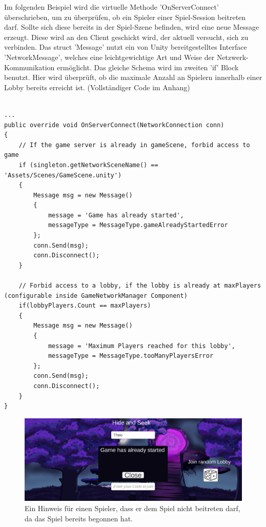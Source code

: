 Im folgenden Beispiel wird die virtuelle Methode 'OnServerConnect' überschrieben, um zu überprüfen, ob ein Spieler einer Spiel-Session beitreten darf. Sollte sich diese bereits in der Spiel-Szene befinden, wird eine neue Message erzeugt. Diese wird an den Client geschickt wird, der aktuell versucht, sich zu verbinden. Das struct 'Message' nutzt ein von Unity bereitgestelltes Interface 'NetworkMessage', welches eine leichtgewichtige Art und Weise der Netzwerk-Kommunikation ermöglicht. Das gleiche Schema wird im zweiten 'if' Block benutzt. Hier wird überprüft, ob die maximale Anzahl an Spielern innerhalb einer Lobby bereits erreicht ist. (Vollständiger Code im Anhang)

\begin{lstlisting}[caption= GameNetworkManager.cs OnServerConnect() und Message struct]

...	
public override void OnServerConnect(NetworkConnection conn)
{
	// If the game server is already in gameScene, forbid access to game
	if (singleton.getNetworkSceneName() == 'Assets/Scenes/GameScene.unity')
	{
		Message msg = new Message()
		{
			message = 'Game has already started',
			messageType = MessageType.gameAlreadyStartedError
		};
		conn.Send(msg);
		conn.Disconnect();
	}
	
	// Forbid access to a lobby, if the lobby is already at maxPlayers (configurable inside GameNetworkManager Component)
	if(lobbyPlayers.Count == maxPlayers)
	{
		Message msg = new Message()
		{
			message = 'Maximum Players reached for this lobby',
			messageType = MessageType.tooManyPlayersError
		};
		conn.Send(msg);
		conn.Disconnect();
	}
}
\end{lstlisting}

\begin{figure}[H]
	\centering
	\includegraphics[width=120mm]{images/prototyp_game_has_already_started.png}
	\caption[Game has already started]{Ein Hinweis für einen Spieler, dass er dem Spiel nicht beitreten darf, da das Spiel bereits begonnen hat.}
	\label{pic:prototyp_game_has_already_started}
\end{figure}

